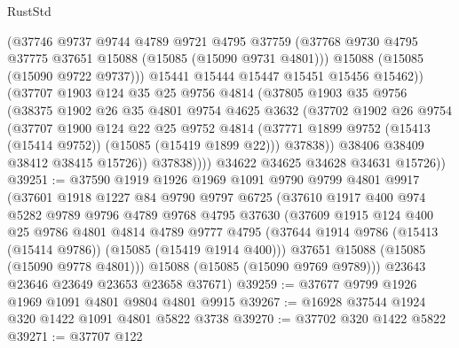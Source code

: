 \begin{lexlean}{RustStd}
\begin{coremodule}
                  (@37746
                    @9737
                    @9744
                    @4789
                    @9721
                    @4795
                    @37759
                    (@37768 @9730 @4795 @37775 @37651 @15088 (@15085 (@15090 @9731 @4801)))
                    @15088
                    (@15085 (@15090 @9722 @9737)))
                  @15441
                  @15444
                  @15447
                  @15451
                  @15456
                  @15462))
              (@37707
                @1903
                @124
                @35
                @25
                @9756
                @4814
                (@37805
                  @1903
                  @35
                  @9756
                  (@38375
                    @1902
                    @26
                    @35
                    @4801
                    @9754
                    @4625
                    @3632
                    (@37702
                      @1902
                      @26
                      @9754
                      (@37707
                        @1900
                        @124
                        @22
                        @25
                        @9752
                        @4814
                        (@37771 @1899 @9752 (@15413 (@15414 @9752)) (@15085 (@15419 @1899 @22)))
                        @37838))
                    @38406
                    @38409
                    @38412
                    @38415
                    @15726))
                @37838))))
        @34622
        @34625
        @34628
        @34631
        @15726))
@39251 := @37590
    @1919
    @1926
    @1969
    @1091
    @9790
    @9799
    @4801
    @9917
    (@37601
      @1918
      @1227
      @84
      @9790
      @9797
      @6725
      (@37610
        @1917
        @400
        @974
        @5282
        @9789
        @9796
        @4789
        @9768
        @4795
        @37630
        (@37609
          @1915
          @124
          @400
          @25
          @9786
          @4801
          @4814
          @4789
          @9777
          @4795
          (@37644 @1914 @9786 (@15413 (@15414 @9786)) (@15085 (@15419 @1914 @400)))
          @37651
          @15088
          (@15085 (@15090 @9778 @4801)))
        @15088
        (@15085 (@15090 @9769 @9789)))
      @23643
      @23646
      @23649
      @23653
      @23658
      @37671)
@39259 := @37677 @9799 @1926 @1969 @1091 @4801 @9804 @4801 @9915
@39267 := @16928 @37544 @1924 @320 @1422 @1091 @4801 @5822 @3738
@39270 := @37702 @320 @1422 @5822
@39271 := @37707 @122

\end{coremodule}
\end{lexlean}
